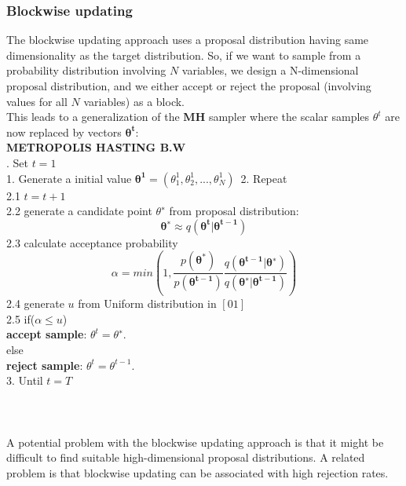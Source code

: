 \subsubsection{Blockwise updating}
The blockwise updating approach uses a proposal distribution having same dimensionality as the target distribution. So, if we want to sample from a probability distribution involving $N$ variables, we design a N-dimensional proposal distribution, and we either accept or reject the proposal (involving values for all $N$ variables) as a block.\\
This leads to a generalization of the \textbf{MH} sampler where the scalar samples $\theta^t$ are now replaced by vectors $\mathbf{\theta^t}$:\\
{\bf METROPOLIS HASTING B.W}\\[.4cm]
{. \hspace*{0.2cm} Set $t=1$  \\
1. \hspace*{0.2cm} Generate a initial value $\mathbf{\theta^1}=(\theta_1^1, \theta_2^1 , . . . ,\theta_N^1 )$\
2. \hspace*{0.2cm}  Repeat\\
2.1 \hspace*{0.3cm} $t=t+1$\\
2.2 \hspace*{0.3cm} generate a candidate point $\theta^∗$ from proposal distribution:\\
$$
\mathbf{\theta^∗} \approx q(\mathbf{\theta^t}|\mathbf{ \theta^{t-1} })
$$
2.3 \hspace*{0.3cm} calculate acceptance probability \\
$$
\alpha = min(1, \frac{p(\mathbf{\theta^*})}{p(\mathbf{\theta^{t-1}})} \frac{q(\mathbf{\theta^{t-1}}|\mathbf{\theta^∗})}{q(\mathbf{\theta^∗} |\mathbf{\theta^{t-1}})} )
$$
2.4 \hspace*{0.3cm} generate $u$ from Uniform distribution in $[0 1]$\\
2.5 \hspace*{0.3cm} if($\alpha  \leq u$)\\
\hspace*{0.4cm}  \textbf{accept sample}: $\theta^t=\theta^∗$.\\
\hspace*{0.3cm} else\\
\hspace*{0.4cm}  \textbf{reject sample}: $\theta^t=\theta^{t-1}$.\\
3. \hspace*{0.2cm} Until $t = T$\\
}\\[.4cm]
\\
\\
A potential problem with the blockwise updating approach is that it might be difficult to
find suitable high-dimensional proposal distributions. A related problem is that blockwise
updating can be associated with high rejection rates. 
